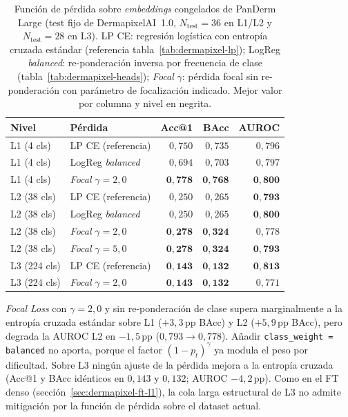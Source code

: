 \begin{table}[H]
\centering
\footnotesize
\setlength{\tabcolsep}{4pt}
\renewcommand{\arraystretch}{0.95}
\caption{Función de pérdida sobre \emph{embeddings} congelados de
PanDerm Large (test fijo de DermapixelAI~1.0,
$N_{\mathrm{test}} = 36$ en L1/L2 y $N_{\mathrm{test}} = 28$ en
L3). LP CE: regresión logística con entropía cruzada estándar
(referencia tabla~\ref{tab:dermapixel-lp}); LogReg
\emph{balanced}: re-ponderación inversa por frecuencia de clase
(tabla~\ref{tab:dermapixel-heads}); \emph{Focal} $\gamma$: pérdida
focal sin re-ponderación con parámetro de focalización indicado.
Mejor valor por columna y nivel en negrita.}
\label{tab:dermapixel-focal}
\begin{tabular}{llrrr}
\hline
Nivel        & Pérdida                                       & Acc@1              & BAcc               & AUROC \\
\hline
L1 (4 cls)   & LP CE (referencia)                            & $0{,}750$          & $0{,}735$          & $0{,}796$ \\
L1 (4 cls)   & LogReg \emph{balanced}                        & $0{,}694$          & $0{,}703$          & $0{,}797$ \\
L1 (4 cls)   & \emph{Focal} $\gamma = 2{,}0$                 & $\mathbf{0{,}778}$ & $\mathbf{0{,}768}$ & $\mathbf{0{,}800}$ \\
\hline
L2 (38 cls)  & LP CE (referencia)                            & $0{,}250$          & $0{,}265$          & $\mathbf{0{,}793}$ \\
L2 (38 cls)  & LogReg \emph{balanced}                        & $0{,}250$          & $0{,}265$          & $\mathbf{0{,}800}$ \\
L2 (38 cls)  & \emph{Focal} $\gamma = 2{,}0$                 & $\mathbf{0{,}278}$ & $\mathbf{0{,}324}$ & $0{,}778$ \\
L2 (38 cls)  & \emph{Focal} $\gamma = 5{,}0$                 & $\mathbf{0{,}278}$ & $\mathbf{0{,}324}$ & $\mathbf{0{,}793}$ \\
\hline
L3 (224 cls) & LP CE (referencia)                            & $\mathbf{0{,}143}$ & $\mathbf{0{,}132}$ & $\mathbf{0{,}813}$ \\
L3 (224 cls) & \emph{Focal} $\gamma = 2{,}0$                 & $\mathbf{0{,}143}$ & $\mathbf{0{,}132}$ & $0{,}771$ \\
\hline
\end{tabular}
\end{table}

\emph{Focal Loss} con $\gamma = 2{,}0$ y sin re-ponderación de
clase supera marginalmente a la entropía cruzada estándar sobre L1
($+3{,}3$\,pp BAcc) y L2 ($+5{,}9$\,pp BAcc), pero degrada la
AUROC L2 en $-1{,}5$\,pp ($0{,}793 \to 0{,}778$). Añadir
\texttt{class\_weight = balanced} no aporta, porque el factor
$(1-p_t)^\gamma$ ya modula el peso por dificultad. Sobre L3 ningún
ajuste de la pérdida mejora a la entropía cruzada (Acc@1 y BAcc
idénticos en $0{,}143$ y $0{,}132$; AUROC $-4{,}2$\,pp). Como en
el FT denso (sección~\ref{sec:dermapixel-ft-l1}), la cola larga
estructural de L3 no admite mitigación por la función de pérdida
sobre el dataset actual.

